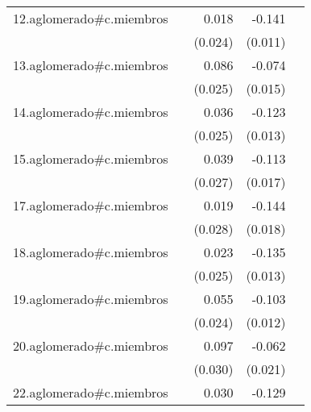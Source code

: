 {\begin{longtable}{l*{4}{D{.}{.}{-1}}}
\addlinespace
12.aglomerado#c.miembros&                     &       0.018         &      -0.141\sym{***}&                     \\
            &                     &     (0.024)         &     (0.011)         &                     \\
\addlinespace
13.aglomerado#c.miembros&                     &       0.086\sym{***}&      -0.074\sym{***}&                     \\
            &                     &     (0.025)         &     (0.015)         &                     \\
\addlinespace
14.aglomerado#c.miembros&                     &       0.036         &      -0.123\sym{***}&                     \\
            &                     &     (0.025)         &     (0.013)         &                     \\
\addlinespace
15.aglomerado#c.miembros&                     &       0.039         &      -0.113\sym{***}&                     \\
            &                     &     (0.027)         &     (0.017)         &                     \\
\addlinespace
17.aglomerado#c.miembros&                     &       0.019         &      -0.144\sym{***}&                     \\
            &                     &     (0.028)         &     (0.018)         &                     \\
\addlinespace
18.aglomerado#c.miembros&                     &       0.023         &      -0.135\sym{***}&                     \\
            &                     &     (0.025)         &     (0.013)         &                     \\
\addlinespace
19.aglomerado#c.miembros&                     &       0.055\sym{*}  &      -0.103\sym{***}&                     \\
            &                     &     (0.024)         &     (0.012)         &                     \\
\addlinespace
20.aglomerado#c.miembros&                     &       0.097\sym{**} &      -0.062\sym{**} &                     \\
            &                     &     (0.030)         &     (0.021)         &                     \\
\addlinespace
22.aglomerado#c.miembros&                     &       0.030         &      -0.129\sym{***}&                     \\

\end{longtable}}
